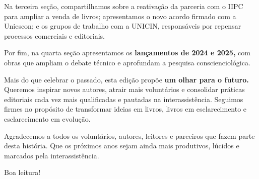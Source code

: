 \documentclass{gescons}
\begin{document}
\begin{multicols}{2}
Na terceira seção, compartilhamos sobre a reativação da parceria com o IIPC para ampliar a venda de livros; apresentamos o novo acordo firmado com a Uniescon; e os grupos de trabalho com a UNICIN, responsáveis por repensar processos comerciais e editoriais.

Por fim, na quarta seção apresentamos os \textbf{lançamentos de 2024 e 2025,} com obras que ampliam o debate técnico e aprofundam a pesquisa conscienciológica.

Mais do que celebrar o passado, esta edição propõe \textbf{um olhar para o futuro.} Queremos inspirar novos autores, atrair mais voluntários e consolidar práticas editoriais cada vez mais qualificadas e pautadas na interassistência. Seguimos firmes no propósito de transformar ideias em livros, livros em esclarecimento e esclarecimento em evolução.

Agradecemos a todos os voluntários, autores, leitores e parceiros que fazem parte desta história. Que os próximos anos sejam ainda mais produtivos, lúcidos e marcados pela interassistência.

Boa leitura!



        
    \end{multicols}

\end{document}
